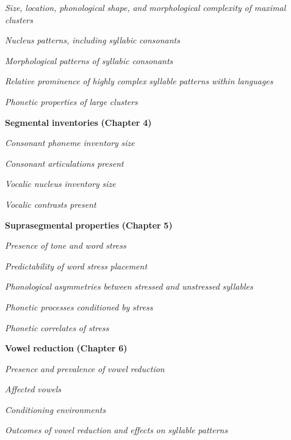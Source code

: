 \textit{Size,} \textit{location,} \textit{phonological} \textit{shape,} \textit{and} \textit{morphological} \textit{complexity} \textit{of} \textit{maximal} \textit{clusters}

\textit{Nucleus} \textit{patterns,} \textit{including} \textit{syllabic} \textit{consonants}

\textit{Morphological} \textit{patterns} \textit{of} \textit{syllabic} \textit{consonants}

\textit{Relative} \textit{prominence} \textit{of} \textit{highly} \textit{complex} \textit{syllable} \textit{patterns} \textit{within} \textit{languages}

\textit{Phonetic} \textit{properties} \textit{of} \textit{large} \textit{clusters}

\textbf{Segmental} \textbf{inventories} \textbf{(Chapter} \textbf{4)}

\textit{Consonant} \textit{phoneme} \textit{inventory} \textit{size}

\textit{Consonant} \textit{articulations} \textit{present}

\textit{Vocalic} \textit{nucleus} \textit{inventory} \textit{size}

\textit{Vocalic} \textit{contrasts} \textit{present}

\textbf{Suprasegmental} \textbf{properties} \textbf{(Chapter} \textbf{5)}

\textit{Presence} \textit{of} \textit{tone} \textit{and} \textit{word} \textit{stress}

\textit{Predictability} \textit{of} \textit{word} \textit{stress} \textit{placement}

\textit{Phonological} \textit{asymmetries} \textit{between} \textit{stressed} \textit{and} \textit{unstressed} \textit{syllables}

\textit{Phonetic} \textit{processes} \textit{conditioned} \textit{by} \textit{stress}

\textit{Phonetic} \textit{correlates} \textit{of} \textit{stress}

\textbf{Vowel} \textbf{reduction} \textbf{(Chapter} \textbf{6)}

\textit{Presence} \textit{and} \textit{prevalence} \textit{of} \textit{vowel} \textit{reduction}

\textit{Affected} \textit{vowels}

\textit{Conditioning} \textit{environments}

\textit{Outcomes} \textit{of} \textit{vowel} \textit{reduction} \textit{and} \textit{effects} \textit{on} \textit{syllable} \textit{patterns}

